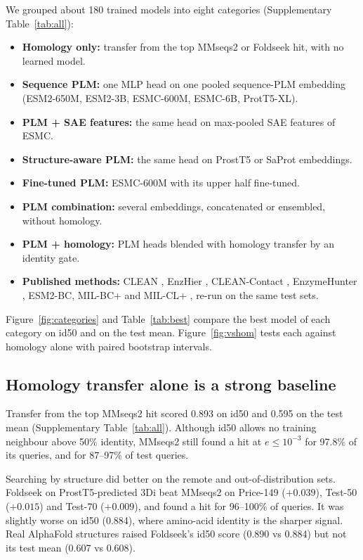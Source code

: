\documentclass[11pt]{article}
\begin{document}
We grouped about 180 trained models into eight categories (Supplementary Table~\ref{tab:all}):
\begin{itemize}
  \item \textbf{Homology only:} transfer from the top MMseqs2 or Foldseek hit, with no learned model.
  \item \textbf{Sequence PLM:} one MLP head on one pooled sequence-PLM embedding (ESM2-650M, ESM2-3B, ESMC-600M, ESMC-6B,
        ProtT5-XL).
  \item \textbf{PLM + SAE features:} the same head on max-pooled SAE features of ESMC.
  \item \textbf{Structure-aware PLM:} the same head on ProstT5 or SaProt embeddings.
  \item \textbf{Fine-tuned PLM:} ESMC-600M with its upper half fine-tuned.
  \item \textbf{PLM combination:} several embeddings, concatenated or ensembled, without homology.
  \item \textbf{PLM + homology:} PLM heads blended with homology transfer by an identity gate.
  \item \textbf{Published methods:} CLEAN \cite{clean}, EnzHier \cite{enzhier}, CLEAN-Contact \cite{cleancontact},
        EnzymeHunter \cite{enzymehunter}, ESM2-BC, MIL-BC+ and MIL-CL+ \cite{milbc}, re-run on the same test sets.
\end{itemize}
Figure~\ref{fig:categories} and Table~\ref{tab:best} compare the best model of each category on id50 and on the test
mean. Figure~\ref{fig:vshom} tests each against homology alone with paired bootstrap intervals.

\subsection{Homology transfer alone is a strong baseline}

Transfer from the top MMseqs2 hit scored 0.893 on id50 and 0.595 on the test mean (Supplementary
Table~\ref{tab:all}). Although id50 allows no training neighbour above 50\% identity, MMseqs2 still found
a hit at $e \leq 10^{-3}$ for 97.8\% of its queries, and for 87--97\% of test queries.

Searching by structure did better on the remote and out-of-distribution sets. Foldseek on ProstT5-predicted 3Di beat
MMseqs2 on Price-149 ($+0.039$), Test-50 ($+0.015$) and Test-70 ($+0.009$), and found a hit for 96--100\% of queries.
It was slightly worse on id50 (0.884), where amino-acid identity is the sharper signal. Real AlphaFold structures
raised Foldseek's id50 score (0.890 vs 0.884) but not its test mean (0.607 vs 0.608).
\end{document}
